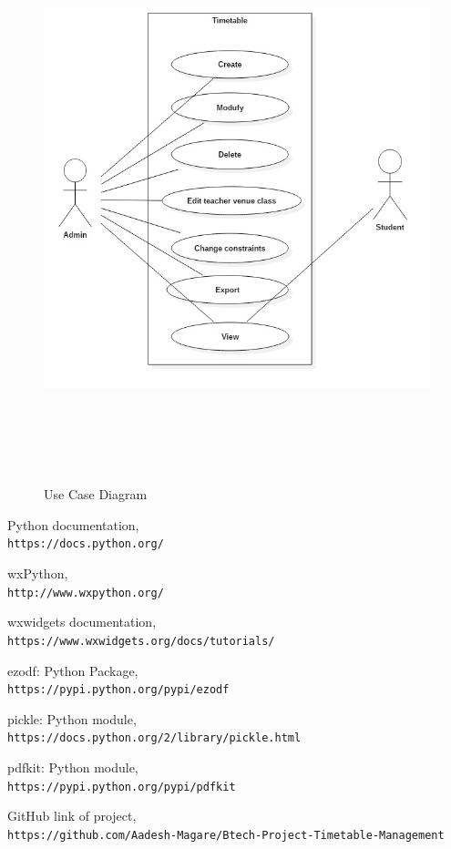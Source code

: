 \documentclass[a4paper,12pt,onecolumn]{report}
\begin{document}
\newpage
\begin{figure}[ht!]
	\centering
	\includegraphics[height=165mm, width=130mm]{usecase.jpg}
	\caption{Use Case Diagram}
\end{figure}



 \medskip
    \begin{thebibliography}{9}
        Python documentation,
        \\\texttt{https://docs.python.org/}   

        wxPython,
        \\\texttt{http://www.wxpython.org/}
       
        wxwidgets documentation,
        \\\texttt{https://www.wxwidgets.org/docs/tutorials/}
       
        ezodf: Python Package,
        \\\texttt{https://pypi.python.org/pypi/ezodf}
       
        pickle: Python module,
        \\\texttt{https://docs.python.org/2/library/pickle.html}
       
        pdfkit: Python module,
        \\\texttt{https://pypi.python.org/pypi/pdfkit}
        
        GitHub link of project,
        \\\texttt{https://github.com/Aadesh-Magare/Btech-Project-Timetable-Management}

    \end{thebibliography}
\end{document}

